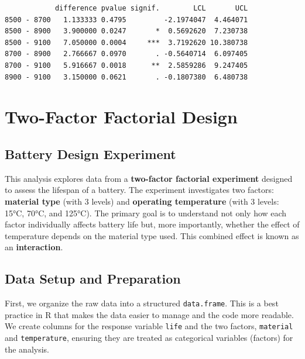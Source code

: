 \documentclass[
  letterpaper,
]{scrbook}
\begin{document}
\begin{verbatim}
            difference pvalue signif.        LCL       UCL
8500 - 8700   1.133333 0.4795         -2.1974047  4.464071
8500 - 8900   3.900000 0.0247       *  0.5692620  7.230738
8500 - 9100   7.050000 0.0004     ***  3.7192620 10.380738
8700 - 8900   2.766667 0.0970       . -0.5640714  6.097405
8700 - 9100   5.916667 0.0018      **  2.5859286  9.247405
8900 - 9100   3.150000 0.0621       . -0.1807380  6.480738
\end{verbatim}


\chapter{Two-Factor Factorial Design}\label{two-factor-factorial-design}

\section{Battery Design Experiment}\label{battery-design-experiment}

This analysis explores data from a \textbf{two-factor factorial
experiment} designed to assess the lifespan of a battery. The experiment
investigates two factors: \textbf{material type} (with 3 levels) and
\textbf{operating temperature} (with 3 levels: 15°C, 70°C, and 125°C).
The primary goal is to understand not only how each factor individually
affects battery life but, more importantly, whether the effect of
temperature depends on the material type used. This combined effect is
known as an \textbf{interaction}.

\section{Data Setup and Preparation}\label{data-setup-and-preparation}

First, we organize the raw data into a structured \texttt{data.frame}.
This is a best practice in R that makes the data easier to manage and
the code more readable. We create columns for the response variable
\texttt{life} and the two factors, \texttt{material} and
\texttt{temperature}, ensuring they are treated as categorical variables
(factors) for the analysis.
\end{document}
